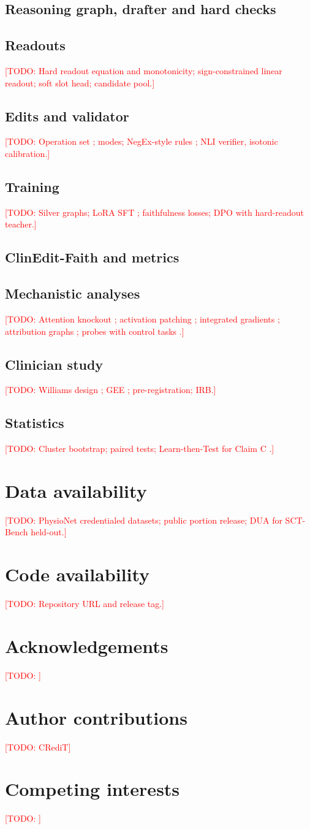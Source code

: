\documentclass[11pt]{article}
\newcommand{\todo}[1]{\textcolor{red}{[TODO: #1]}}
\begin{document}
\subsection*{Reasoning graph, drafter and hard checks}
\subsection*{Readouts}
\todo{Hard readout equation and monotonicity; sign-constrained linear readout; soft slot head; candidate pool.}
\subsection*{Edits and validator}
\todo{Operation set \cite{you2026counterfactual}; modes; NegEx-style rules \cite{chapman2001negex}; NLI verifier, isotonic calibration.}
\subsection*{Training}
\todo{Silver graphs; LoRA SFT \cite{hu2021lora}; faithfulness losses; DPO \cite{rafailov2023dpo} with hard-readout teacher.}
\subsection*{ClinEdit-Faith and metrics}
\subsection*{Mechanistic analyses}
\todo{Attention knockout \cite{geva2023dissecting}; activation patching \cite{meng2022rome}; integrated gradients \cite{sundararajan2017}; attribution graphs \cite{ameisen2025circuit}; probes with control tasks \cite{hewitt2019}.}
\subsection*{Clinician study}
\todo{Williams design \cite{williams1949}; GEE \cite{liang1986}; pre-registration; IRB.}
\subsection*{Statistics}
\todo{Cluster bootstrap; paired tests; Learn-then-Test for Claim C \cite{angelopoulos2021ltt}.}

\section*{Data availability}
\todo{PhysioNet credentialed datasets; public portion release; DUA for SCT-Bench held-out.}
\section*{Code availability}
\todo{Repository URL and release tag.}
\section*{Acknowledgements}\todo{}
\section*{Author contributions}\todo{CRediT}
\section*{Competing interests}\todo{}



\end{document}
